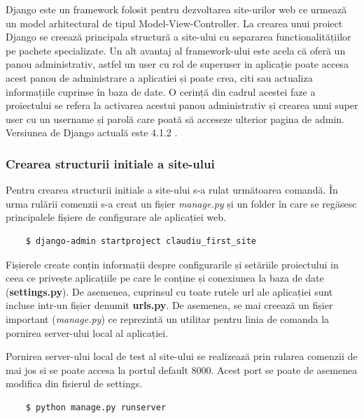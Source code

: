 \par
Django este un framework folosit pentru dezvoltarea site-urilor web ce urmează un model arhitectural de tipul Model-View-Controller. La crearea unui proiect Django se creează principala structură a site-ului cu separarea functionalitățiilor pe pachete specializate. Un alt avantaj al framework-ului este acela că oferă un panou administrativ, astfel un user cu rol de superuser in aplicație poate accesa acest panou de administrare a aplicatiei și poate crea, citi sau actualiza informațiile cuprinse în baza de date. O cerință din cadrul acestei faze a proiectului se refera la activarea acestui panou administrativ și crearea unui super user cu un username și parolă care poată să acceseze ulterior pagina de admin. Versiunea de Django actuală este 4.1.2 .

\subsubsection{Crearea structurii initiale a site-ului}
\hspace{\parindent} Pentru crearea structurii initiale a site-ului s-a rulat următoarea comandă. În urma rulării comenzii s-a creat un fișier \textit{manage.py} și un folder în care se regăsesc principalele fișiere de configurare ale aplicației web. 
\begin{verbatim}
    $ django-admin startproject claudiu_first_site
\end{verbatim}

Fișierele create conțin informații despre configurarile și setăriile proiectului in ceea ce privește aplicațiile pe care le conține și conexiunea la baza de date (\textbf{settings.py}). De asemenea, cuprinsul cu toate rutele url ale aplicației sunt incluse intr-un fișier denumit \textbf{urls.py}. De asemenea, se mai creează un fișier important (\textit{manage.py}) ce reprezintă un utilitar pentru linia de comanda la pornirea server-ului local al aplicației. \par
Pornirea server-ului local de test al site-ului se realizează prin rularea comenzii de mai jos si se poate accesa la portul default 8000. Acest port se poate de asemenea modifica din fisierul de settings.
\begin{verbatim}
    $ python manage.py runserver
\end{verbatim}

